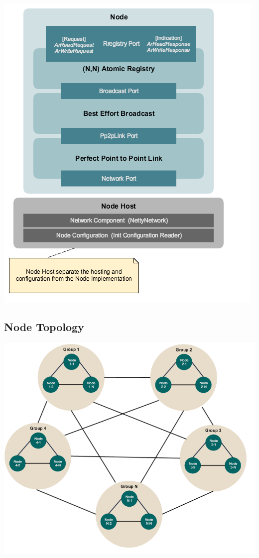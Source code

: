 \documentclass[a4paper, 11pt]{article}
\begin{document}
{\centering\includegraphics[scale = 0.5]{./images/design_overview.png}\par}

\subsection{Node Topology}

{\centering\includegraphics[scale = 0.6]{./images/node_setup.png}\par}
\end{document}
